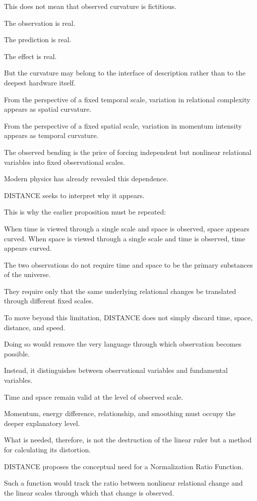 This does not mean that observed curvature is fictitious.

The observation is real.

The prediction is real.

The effect is real.

But the curvature may belong to the interface of description rather than to the deepest hardware itself.

From the perspective of a fixed temporal scale, variation in relational complexity appears as spatial curvature.

From the perspective of a fixed spatial scale, variation in momentum intensity appears as temporal curvature.

The observed bending is the price of forcing independent but nonlinear relational variables into fixed observational scales.

Modern physics has already revealed this dependence.

DISTANCE seeks to interpret why it appears.

This is why the earlier proposition must be repeated:

When time is viewed through a single scale and space is observed, space appears curved. When space is viewed through a single scale and time is observed, time appears curved.

The two observations do not require time and space to be the primary substances of the universe.

They require only that the same underlying relational changes be translated through different fixed scales.

To move beyond this limitation, DISTANCE does not simply discard time, space, distance, and speed.

Doing so would remove the very language through which observation becomes possible.

Instead, it distinguishes between observational variables and fundamental variables.

Time and space remain valid at the level of observed scale.

Momentum, energy difference, relationship, and smoothing must occupy the deeper explanatory level.

What is needed, therefore, is not the destruction of the linear ruler but a method for calculating its distortion.

DISTANCE proposes the conceptual need for a Normalization Ratio Function.

Such a function would track the ratio between nonlinear relational change and the linear scales through which that change is observed.

